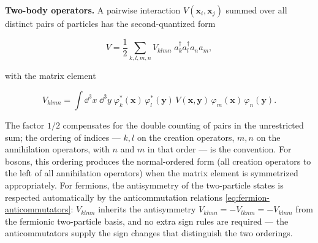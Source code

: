 \medskip\noindent\textbf{Two-body operators.}
A pairwise interaction $V(\bm x_i, \bm x_j)$ summed over all distinct pairs of particles has the second-quantized form
\begin{linenomath}
    \begin{equation}
        V = \frac{1}{2}\sum_{k,l,m,n} V_{klmn}\;a_k^\dagger a_l^\dagger a_n a_m,
        \label{eq:two-body-operator}
    \end{equation}
\end{linenomath}
with the matrix element
\begin{linenomath}
    \begin{equation*}
        V_{klmn}
        = \int\!\dd^3 x\;\dd^3 y\;
          \varphi_k^*(\bm x)\,\varphi_l^*(\bm y)\,
          V(\bm x, \bm y)\,
          \varphi_m(\bm x)\,\varphi_n(\bm y).
    \end{equation*}
\end{linenomath}
The factor $1/2$ compensates for the double counting of pairs in the unrestricted sum; the ordering of indices --- $k,l$ on the creation operators, $m,n$ on the annihilation operators, with $n$ and $m$ in that order --- is the convention. For bosons, this ordering produces the normal-ordered form (all creation operators to the left of all annihilation operators) when the matrix element is symmetrized appropriately. For fermions, the antisymmetry of the two-particle states is respected automatically by the anticommutation relations \eqref{eq:fermion-anticommutators}: $V_{klmn}$ inherits the antisymmetry $V_{klmn} = -V_{lkmn} = -V_{klnm}$ from the fermionic two-particle basis, and no extra sign rules are required --- the anticommutators supply the sign changes that distinguish the two orderings.

